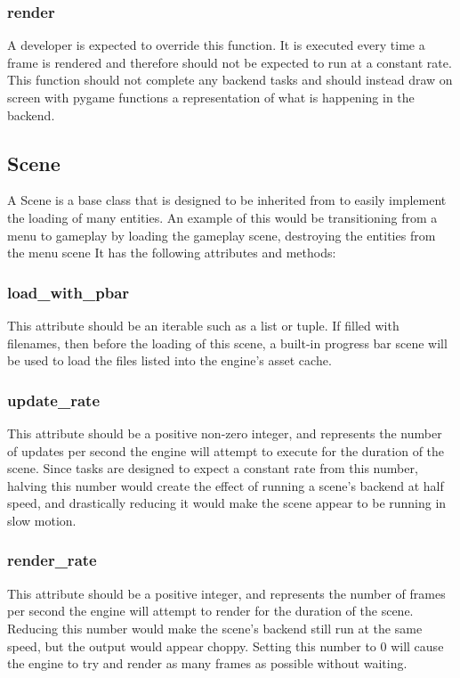 \documentclass{report}
\begin{document}
\subsubsection{render}

A developer is expected to override this function. It is executed every time a frame is rendered and therefore should not be expected to run at a constant rate. This function should not complete any backend tasks and should instead draw on screen with pygame functions a representation of what is happening in the backend.

\subsection{Scene}

A Scene is a base class that is designed to be inherited from to easily implement the loading of many entities. An example of this would be transitioning from a menu to gameplay by loading the gameplay scene, destroying the entities from the menu scene It has the following attributes and methods:

\subsubsection{load\_with\_pbar}

This attribute should be an iterable such as a list or tuple. If filled with filenames, then before the loading of this scene, a built-in progress bar scene will be used to load the files listed into the engine's asset cache.

\subsubsection{update\_rate}

This attribute should be a positive non-zero integer, and represents the number of updates per second the engine will attempt to execute for the duration of the scene. Since tasks are designed to expect a constant rate from this number, halving this number would create the effect of running a scene's backend at half speed, and drastically reducing it would make the scene appear to be running in slow motion.

\subsubsection{render\_rate}

This attribute should be a positive integer, and represents the number of frames per second the engine will attempt to render for the duration of the scene. Reducing this number would make the scene's backend still run at the same speed, but the output would appear choppy. Setting this number to 0 will cause the engine to try and render as many frames as possible without waiting.
\end{document}
